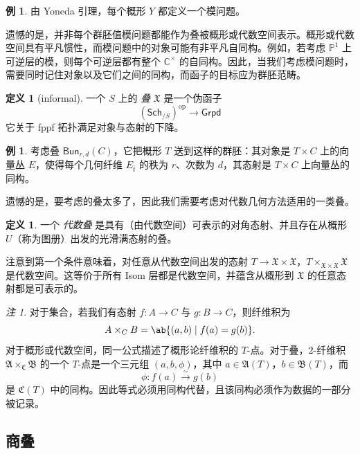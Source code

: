 \documentclass{amsart}
\theoremstyle{definition}
\newtheorem{defn}[thm]{定义}
\newtheorem{exm}[thm]{例}
\theoremstyle{remark}
\newtheorem{rmk}[thm]{注}
\theoremstyle{plain}
\theoremstyle{definition}
\theoremstyle{remark}
\newcommand{\C}{\mathbb{C}}
\renewcommand{\P}{\mathbb{P}}
\newcommand{\mf}[1]{\mathfrak{#1}}
\newcommand{\mr}[1]{\mathrm{#1}}
\newcommand{\ms}[1]{\mathsf{#1}}
\newcommand{\1}{\mathbf{1}}
\newcommand{\2}{\mathbf{2}}
\newcommand{\3}{\mathbf{3}}
\begin{document}
\begin{exm}
    由 Yoneda 引理，每个概形 \(Y\) 都定义一个模问题。
\end{exm}

遗憾的是，并非每个群胚值模问题都能作为叠被概形或代数空间表示。概形或代数空间具有平凡惯性，而模问题中的对象可能有非平凡自同构。例如，若考虑 \(\P^1\) 上可逆层的模，则每个可逆层都有整个 \(\C^{\times}\) 的自同构。因此，当我们考虑模问题时，需要同时记住对象以及它们之间的同构，而函子的目标应为群胚范畴。

\begin{defn}[informal]
    一个 \(S\) 上的 \textit{叠} \(\mf{X}\) 是一个伪函子
    \[ (\ms{Sch}_{/S})^{\mr{op}} \to \ms{Grpd} \]
    它关于 fppf 拓扑满足对象与态射的下降。
\end{defn}

\begin{exm}
    考虑叠 \(\ms{Bun}_{r,d}(C)\)，它把概形 \(T\) 送到这样的群胚：其对象是 \(T\times C\) 上的向量丛 \(E\)，使得每个几何纤维 \(E_{\bar t}\) 的秩为 \(r\)、次数为 \(d\)，其态射是 \(T\times C\) 上向量丛的同构。
\end{exm}

遗憾的是，要考虑的叠太多了，因此我们需要考虑对代数几何方法适用的一类叠。

\begin{defn}
    一个 \textit{代数叠} 是具有（由代数空间）可表示的对角态射、并且存在从概形 \(U\)（称为图册）出发的光滑满态射的叠。
\end{defn}

注意到第一个条件意味着，对任意从代数空间出发的态射 \(T \to \mf{X} \times \mf{X}\)，\(T \times_{\mf{X} \times \mf{X}} \mf{X}\) 是代数空间。这等价于所有 Isom 层都是代数空间，并蕴含从概形到 \(\mf{X}\) 的任意态射都是可表示的。

\begin{rmk}
    对于集合，若我们有态射 \(f\colon A\to C\) 与 \(g\colon B\to C\)，则纤维积为
    \[ 
        A\times_C B=\ab\{(a,b)\mid f(a)=g(b)\}. 
    \] 
    对于概形或代数空间，同一公式描述了概形论纤维积的 \(T\)-点。对于叠，\(2\)-纤维积 \(\mf{A}\times_{\mf{C}}\mf{B}\) 的一个 \(T\)-点是一个三元组 \((a,b,\phi)\)，其中 \(a\in\mf{A}(T)\)，\(b\in\mf{B}(T)\)，而
    \[ 
        \phi\colon f(a)\xrightarrow{\sim}g(b) 
    \]
    是 \(\mf{C}(T)\) 中的同构。因此等式必须用同构代替，且该同构必须作为数据的一部分被记录。
\end{rmk}


\subsection{商叠}%
\label{sub:Quotient stacks}
\end{document}

